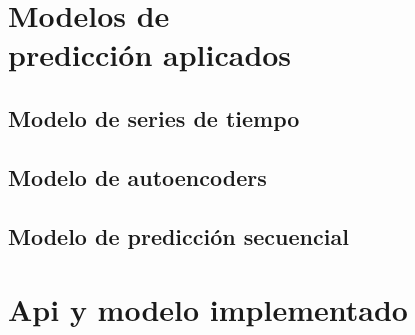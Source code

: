\documentclass[letterpaper, 12pt]{report}
\begin{document}
% 

%

%

%

\chapter[Modelos de predicción aplicados]{Modelos de\\ predicción aplicados}

\section{Modelo de series de tiempo}


\section{Modelo de autoencoders}


\section{Modelo de predicción secuencial}


\chapter{Api y modelo implementado}

\end{document}
